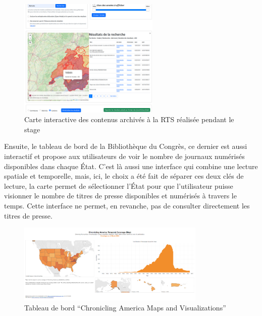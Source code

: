 \begin{figure}[h!]
	\centering
	\includegraphics[width=0.6\textwidth]{images/image14.png}
	\caption{Carte interactive des contenus archivés à la RTS réalisée pendant le stage}
	\label{fig:image14}
\end{figure}


Ensuite, le tableau de bord de la Bibliothèque du Congrès, ce dernier est aussi interactif et propose aux utilisateurs de voir le nombre de journaux numérisés disponibles dans chaque État. C’est là aussi une interface qui combine une lecture spatiale et temporelle, mais, ici, le choix a été fait de séparer ces deux clés de lecture, la carte permet de sélectionner l’État pour que l’utilisateur puisse visionner le nombre de titres de presse disponibles et numérisés à travers le temps. Cette interface ne permet, en revanche, pas de consulter directement les titres de presse.


\begin{figure}[h!]
	\centering
	\includegraphics[width=0.8\textwidth]{images/image15.png}
	\caption{Tableau de bord \enquote{Chronicling America Maps and Visualizations}}
	\label{fig:image15}
\end{figure}



